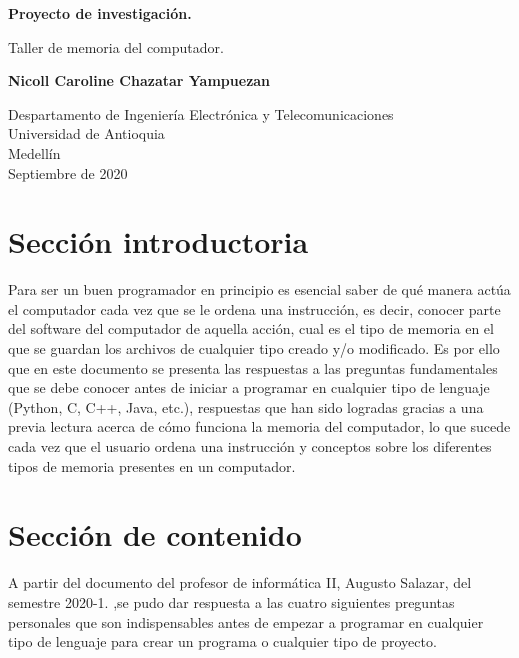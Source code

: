 \documentclass{article}
\begin{document}
\begin{titlepage}
    \begin{center}
        \vspace*{1cm}
            
        \Huge
        \textbf{Proyecto de investigación.}
            
        \vspace{0.5cm}
        \LARGE
        Taller de memoria del computador.
            
        \vspace{1.5cm}
            
        \textbf{Nicoll Caroline Chazatar Yampuezan}
            
        \vfill
            
        \vspace{0.8cm}
            
        \Large
        Despartamento de Ingeniería Electrónica y Telecomunicaciones\\
        Universidad de Antioquia\\
        Medellín\\
        Septiembre de 2020
            
    \end{center}
\end{titlepage}

\tableofcontents

\section{Sección introductoria}Para ser un buen programador en principio es esencial saber de qué manera actúa el computador cada vez que se le ordena una instrucción, es decir, conocer parte del software del computador de aquella acción, cual es el tipo de memoria en el que se guardan los archivos de cualquier tipo creado y/o modificado. Es por ello que en este documento se presenta las respuestas a las preguntas fundamentales que se debe conocer antes de iniciar a programar en cualquier tipo de lenguaje (Python, C, C++, Java, etc.), respuestas que han sido logradas gracias a una previa lectura acerca de cómo funciona la memoria del computador, lo que sucede cada vez que el usuario ordena una instrucción y conceptos sobre los diferentes tipos de memoria presentes en un computador.

\section{Sección de contenido} \label{contenido}
A partir del documento del profesor de informática II, Augusto Salazar, del semestre 2020-1. \cite{Salazar},se pudo dar respuesta a las cuatro siguientes preguntas  personales que son indispensables antes de empezar a programar en cualquier tipo de lenguaje para crear un programa o cualquier tipo de proyecto.\\
\end{document}
